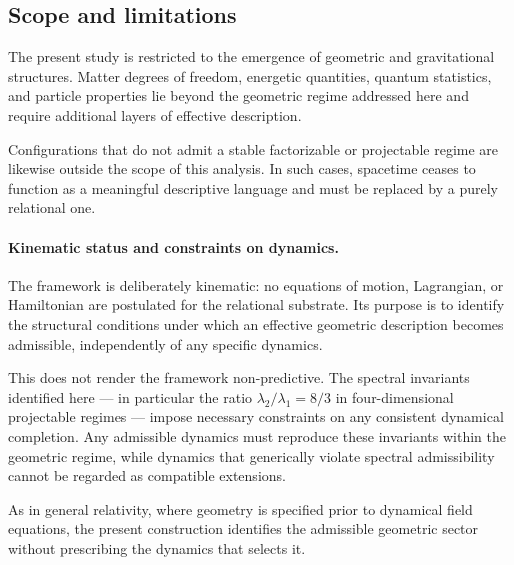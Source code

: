 \subsection{Scope and limitations}
  \label{subsec:discussion-scope-and-limitations}

  The present study is restricted to the emergence of geometric and
  gravitational structures.
  Matter degrees of freedom, energetic quantities, quantum statistics,
  and particle properties lie beyond the geometric regime addressed here
  and require additional layers of effective description.

  Configurations that do not admit a stable factorizable or projectable
  regime are likewise outside the scope of this analysis.
  In such cases, spacetime ceases to function as a meaningful
  descriptive language and must be replaced by a purely relational one.

  \paragraph{Kinematic status and constraints on dynamics.}
    The framework is deliberately kinematic: no equations of motion,
    Lagrangian, or Hamiltonian are postulated for the relational substrate.
    Its purpose is to identify the structural conditions under which an
    effective geometric description becomes admissible, independently of
    any specific dynamics.

    This does not render the framework non-predictive.
    The spectral invariants identified here — in particular the ratio
    $\lambda_2/\lambda_1 = 8/3$ in four-dimensional projectable regimes —
    impose necessary constraints on any consistent dynamical completion.
    Any admissible dynamics must reproduce these invariants within the
    geometric regime, while dynamics that generically violate spectral
    admissibility cannot be regarded as compatible extensions.

    As in general relativity, where geometry is specified prior to
    dynamical field equations, the present construction identifies the
    admissible geometric sector without prescribing the dynamics that
    selects it.
